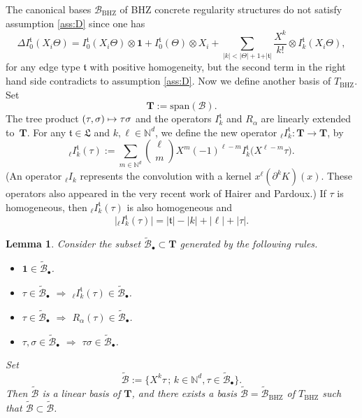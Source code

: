 \documentclass[10pt]{amsart}
\newcommand\mto{\mathchoice{\longmapsto}{\mapsto}{\mapsto}{\mapsto}}
\newcommand{\sbullet}{{\scriptscriptstyle\bullet}}
\theoremstyle{plain}
\newtheorem{lem}[thm]{Lemma}
\theoremstyle{definition}
\newcommand{\unit}{\mathbf{1}}
\newcommand{\BHZ}{{\scriptscriptstyle\mathrm{BHZ}}}
\newcommand{\bsT}{\boldsymbol{T}}
\newcommand{\bsmcB}{\boldsymbol{\mathcal{B}}}
\newcommand{\frkL}{\mathfrak{L}}
\newcommand{\frkt}{\mathfrak{t}}
\newcommand{\bbN}{\mathbb{N}}
\newcommand{\mcB}{\mathcal{B}}
\begin{document}
The canonical bases $\mcB_{\BHZ}$ of BHZ concrete regularity structures do not satisfy assumption \eqref{ass:D} since one has
\[
\Delta I^{\frkt}_0(X_i\Theta) = I^{\frkt}_0(X_i\Theta)\otimes\unit + I^{\frkt}_0(\Theta)\otimes X_i + \sum_{\vert k\vert< \vert\Theta\vert+1+\vert\frkt\vert}\frac{X^k}{k!}\otimes I^{\frkt}_k(X_i\Theta),
\]
for any edge type $\frkt$ with positive homogeneity, but the second term in the right hand side contradicts to assumption \eqref{ass:D}.
Now we define another basis of $T_{\BHZ}$. Set\vspace*{-3pt}
\[
\bsT := \textrm{span}(\bsmcB).
\]
The tree product $(\tau,\sigma)\mto\tau\sigma$ and the operators $I_k^\frkt$ and $R_\alpha$ are linearly extended to~$\bsT$. For any $\frkt\in\frkL$ and $k,\ell\in\bbN^d$, we define the new operator ${}_\ell I_k^\frkt:\bsT\to \bsT$, by\vspace*{-3pt}
\[
{}_\ell I_k^\frkt(\tau) := \sum_{m\in\bbN^d}\binom{\ell}{m}X^m(-1)^{\ell-m}I_k^\frkt\bigl(X^{\ell-m}\tau\bigr).
\]
(An operator ${}_\ell I_k$ represents the convolution with a kernel $x^\ell(\partial^k K)(x)$. These oper\-ators also appeared in the very recent work \cite{HP19} of Hairer and Pardoux.) If $\tau$ is homogeneous, then ${}_\ell I_k^\frkt(\tau)$ is also homogeneous and\vspace*{-3pt}
\[
\big|{}_\ell I_k^\frkt(\tau)\big| = |\frkt| - |k| + |\ell | + |\tau|.
\]

\begin{lem}
Consider the subset $\widetilde{\bsmcB}_\sbullet\subset \bsT$ generated by the following rules.
\begin{itemize}
\item $\unit\in\widetilde{\bsmcB}_\sbullet$.
\item $\tau\in\widetilde{\bsmcB}_\sbullet$ $\Rightarrow$ ${}_\ell I_k^\frkt(\tau)\in\widetilde{\bsmcB}_\sbullet$.
\item $\tau\in\widetilde{\bsmcB}_\sbullet$ $\Rightarrow$ $R_\alpha(\tau)\in\widetilde{\bsmcB}_\sbullet$.
\item $\tau,\sigma\in\widetilde{\bsmcB}_\sbullet$ $\Rightarrow$ $\tau\sigma\in\widetilde{\bsmcB}_\sbullet$.
\end{itemize}
Set\vspace*{-3pt}
\[
\widetilde{\bsmcB} := \big\{X^k\tau\,;\, k\in\bbN^d, \tau\in\widetilde{\bsmcB}_\sbullet\big\}.
\]
Then $\widetilde{\bsmcB}$ is a linear basis of $\bsT$, and there exists a basis $\widetilde{\mcB}=\widetilde{\mcB}_{\BHZ}$ of $T_{\BHZ}$ such that $\widetilde{\mcB}\subset\widetilde{\bsmcB}$.
\end{lem}
\end{document}
